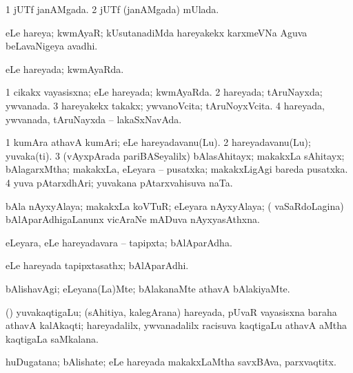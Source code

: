 \bentry
{}
\gl{\gu}
\bmng
\bnum
\num{1} jUTf janAMgada. 
\num{2} jUTf (janAMgada) mUlada. 
\enum
\emng
\eentry

\bentry
{}
\gl{\nA}
\bmng
eLe hareya; kwmAyaR; kUsutanadiMda hareyakekx karxmeVNa Aguva beLavaNigeya avadhi. 
\emng
\eentry

\bentry
{}
\gl{\gu}
\bmng
eLe hareyada; kwmAyaRda. 
\emng
\eentry

\bentry
{}
\gl{\gu}
\bmng
\bnum
\num{1} cikakx vayasisxna; eLe hareyada; kwmAyaRda. 
\num{2} hareyada; tAruNayxda; ywvanada. 
\num{3} hareyakekx takakx; ywvanoVcita; tAruNoyxVcita. 
\num{4} hareyada, ywvanada, tAruNayxda -- lakaSxNavAda. 
\enum
\emng
\eentry

\bentry
{}
\gl{\nA}
\bmng
\bnum
\num{1} kumAra athavA kumAri; eLe hareyadavanu(Lu). 
\num{2} hareyadavanu(Lu); yuvaka(ti). 
\num{3} (vAyxpArada pariBASeyalilx) bAlasAhitayx; makakxLa sAhitayx; bAlagarxMtha; makakxLa, eLeyara -- pusatxka; makakxLigAgi bareda pusatxka. 
\num{4} yuva pAtarxdhAri; yuvakana pAtarxvahisuva naTa. 
\enum
\emng
\eentry

\bentry
{}
\gl{\nA}
\bmng
bAla nAyxyAlaya; makakxLa koVTuR; eLeyara nAyxyAlaya; ( vaSaRdoLagina) bAlAparAdhigaLanunx vicAraNe mADuva nAyxyasAthxna. 
\emng
\eentry

\bentry
{}
\gl{\nA}
\bmng
eLeyara, eLe hareyadavara -- tapipxta; bAlAparAdha. 
\emng
\eentry

\bentry
{}
\gl{\nA}
\bmng
eLe hareyada tapipxtasathx; bAlAparAdhi. 
\emng
\eentry

\bentry
{}
\gl{\kirxvi}
\bmng
bAlishavAgi; eLeyana(La)Mte; bAlakanaMte athavA bAlakiyaMte. 
\emng
\eentry

\bentry
{}
\gl{\nA}
\bmng
(\bava) yuvakaqtigaLu; (sAhitiya, kalegArana) hareyada, pUvaR vayasisxna baraha athavA kalAkaqti; hareyadalilx, ywvanadalilx racisuva kaqtigaLu athavA aMtha kaqtigaLa saMkalana. 
\emng
\eentry

\bentry
{}
\gl{\nA}
\bmng
huDugatana; bAlishate; eLe hareyada makakxLaMtha savxBAva, parxvaqtitx. 
\emng
\eentry

